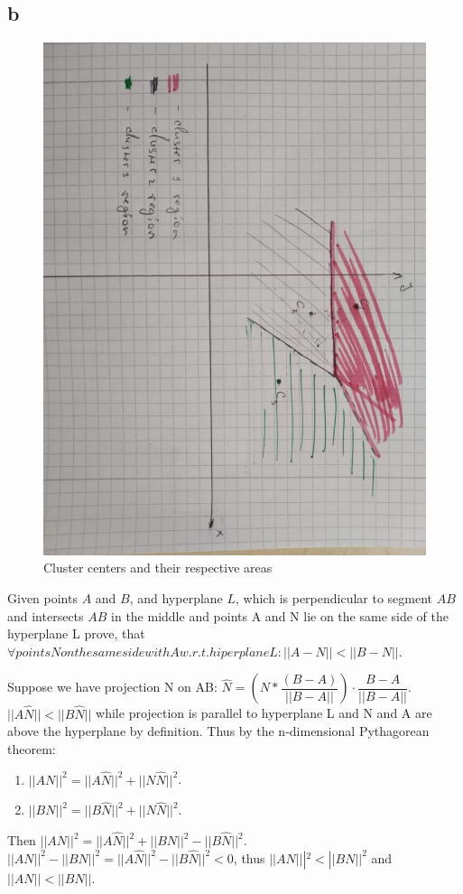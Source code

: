 \subsection*{b}
\begin{figure}[h!]
	\centering
	\includegraphics[width=\linewidth, angle=90]{task4b.jpeg}
	\caption{Cluster centers and their respective areas}
\end{figure}
Given points $A$ and $B$, and hyperplane $L$, which is perpendicular to segment $AB$ and intersects $AB$ in the middle
and points A and N lie on the same side of the hyperplane L prove, that $\forall points N on the same side with A w.r.t. hiperplane L: ||A-N|| < ||B-N||$.

Suppose we have projection N on AB: $\hat{N} = (N * \dfrac{(B-A)}{||B-A||}) \cdot \dfrac{B-A}{||B-A||}$.
$||A\hat{N}|| < ||B\hat{N}||$ while projection is parallel to hyperplane L and N and A are above the hyperplane by definition.
Thus by the n-dimensional Pythagorean theorem: 
\begin{enumerate}
	\item $||AN||^2 = ||A\hat{N}||^2 + ||N\hat{N}||^2$. 
	\item $||BN||^2 = ||B\hat{N}||^2 + ||N\hat{N}||^2$.
\end{enumerate} 
Then $||AN||^2 = ||A\hat{N}||^2 + ||BN||^2 -||B\hat{N}||^2$.
$||AN||^2 - ||BN||^2 = ||A\hat{N}||^2  - ||B\hat{N}||^2 < 0$, thus $||AN|||^2 < ||BN||^2$ and $||AN|| < ||BN||$.

